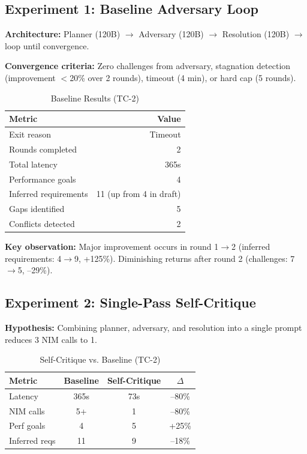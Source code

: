 \documentclass[conference]{IEEEtran}
\begin{document}
\subsection{Experiment 1: Baseline Adversary Loop}

\textbf{Architecture:} Planner (120B) $\rightarrow$ Adversary (120B) $\rightarrow$ Resolution (120B) $\rightarrow$ loop until convergence.

\textbf{Convergence criteria:} Zero challenges from adversary, stagnation detection (improvement $<$20\% over 2 rounds), timeout (4 min), or hard cap (5 rounds).

\begin{table}[h]
\centering
\caption{Baseline Results (TC-2)}
\label{tab:baseline}
\begin{tabular}{@{}lr@{}}
\toprule
\textbf{Metric} & \textbf{Value} \\
\midrule
Exit reason & Timeout \\
Rounds completed & 2 \\
Total latency & 365s \\
Performance goals & 4 \\
Inferred requirements & 11 (up from 4 in draft) \\
Gaps identified & 5 \\
Conflicts detected & 2 \\
\bottomrule
\end{tabular}
\end{table}

\textbf{Key observation:} Major improvement occurs in round 1$\rightarrow$2 (inferred requirements: 4$\rightarrow$9, +125\%). Diminishing returns after round 2 (challenges: 7$\rightarrow$5, --29\%).

\subsection{Experiment 2: Single-Pass Self-Critique}

\textbf{Hypothesis:} Combining planner, adversary, and resolution into a single prompt reduces 3 NIM calls to 1.

\begin{table}[h]
\centering
\caption{Self-Critique vs. Baseline (TC-2)}
\label{tab:selfcritique}
\begin{tabular}{@{}lccc@{}}
\toprule
\textbf{Metric} & \textbf{Baseline} & \textbf{Self-Critique} & \textbf{$\Delta$} \\
\midrule
Latency & 365s & 73s & --80\% \\
NIM calls & 5+ & 1 & --80\% \\
Perf goals & 4 & 5 & +25\% \\
Inferred reqs & 11 & 9 & --18\% \\
\bottomrule
\end{tabular}
\end{table}
\end{document}
